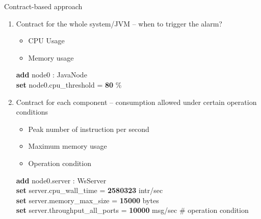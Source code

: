 \documentclass[10pt,xcolor={dvipsnames}]{beamer}
\begin{document}
	\begin{frame}{Contract-based approach}
		\begin{enumerate}
			\item<1-> Contract for the whole system/JVM -- when to trigger the alarm?
					\begin{itemize}
						\item CPU Usage
						\item Memory usage
					\end{itemize}
			\begin{scriptsize}
			\begin{example}
					\hspace{.5cm} \textbf{add} node0 : JavaNode\\
					\hspace{.5cm} \textbf{set} node0.cpu\_threshold = \textbf{80} \% \\
			\end{example}
			\end{scriptsize}
			\item<2> Contract for each component -- consumption allowed under certain operation conditions
				\begin{itemize}
					\item Peak number of instruction per second
					\item Maximum memory usage
					\item Operation condition %
				\end{itemize}
				\begin{scriptsize}\begin{example}
						\hspace{.5cm} \textbf{add} node0.server : WsServer\\
						\hspace{.5cm} \textbf{set} server.cpu\_wall\_time = \textbf{2580323} intr/sec \\
						\hspace{.5cm} \textbf{set} server.memory\_max\_size = \textbf{15000} bytes\\
						\hspace{.5cm} \textbf{set} server.throughput\_all\_ports = \textbf{10000} msg/sec {\color{Emerald} \# operation condition} \\
				\end{example}
				\end{scriptsize}
		\end{enumerate}
		
	\end{frame}
	
\end{document}
